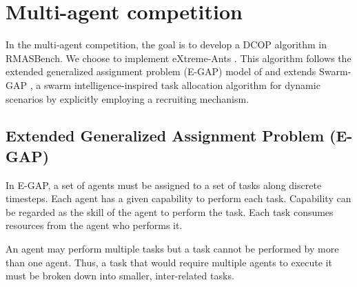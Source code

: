 \section{Multi-agent competition}
\label{sec:multi-agent}

In the multi-agent competition, the goal is to develop a DCOP algorithm in RMASBench. We choose to implement eXtreme-Ants \cite{Santos&Bazzan2009optmas}. This algorithm follows the extended generalized assignment problem (E-GAP) model of \cite{Scerri+2005} and extends Swarm-GAP \cite{Ferreira+2008ccmms}, a swarm intelligence-inspired task allocation algorithm for dynamic scenarios by explicitly employing a recruiting mechanism.

\subsection{Extended Generalized Assignment Problem (E-GAP)}
\label{sec:egap}
In E-GAP, a set of agents must be assigned to a set of tasks along discrete timesteps. Each agent has a given capability to perform each task. Capability can be regarded as the skill of the agent to perform the task. Each task consumes resources from the agent who performs it.



An agent may perform multiple tasks but a task cannot be performed by more than one agent. Thus, a task that would require multiple agents to execute it must be broken down into smaller, inter-related tasks. %


